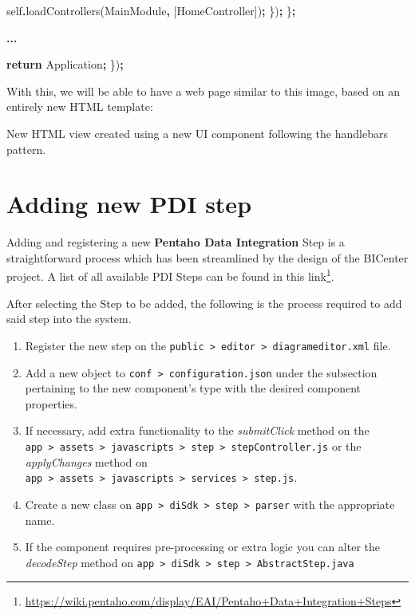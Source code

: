 \documentclass[
  11pt,
]{krantz}
\newenvironment{Shaded}{\begin{snugshade}}{\end{snugshade}}
\newcommand{\ControlFlowTok}[1]{\textcolor[rgb]{0.27,0.27,0.27}{\textbf{#1}}}
\newcommand{\FunctionTok}[1]{\textcolor[rgb]{0,0,0}{#1}}
\newcommand{\NormalTok}[1]{#1}
\newcommand{\OperatorTok}[1]{\textcolor[rgb]{0.43,0.43,0.43}{\textbf{#1}}}
\newcommand{\StringTok}[1]{\textcolor[rgb]{0.5,0.5,0.5}{#1}}
\providecommand{\tightlist}{%
  \setlength{\itemsep}{0pt}\setlength{\parskip}{0pt}}
\renewcommand{\href}[2]{#2\footnote{\url{#1}}}
\begin{document}
\begin{Shaded}
\begin{Highlighting}[]
\NormalTok{            self}\OperatorTok{.}\FunctionTok{loadControllers}\NormalTok{(}\StringTok{\textquotesingle{}MainModule\textquotesingle{}}\OperatorTok{,}\NormalTok{ [}\StringTok{\textquotesingle{}HomeController\textquotesingle{}}\NormalTok{])}\OperatorTok{;}
\NormalTok{        \})}\OperatorTok{;}
\NormalTok{    \}}\OperatorTok{;}

    \OperatorTok{...}

    \ControlFlowTok{return}\NormalTok{ Application}\OperatorTok{;}
\NormalTok{\})}\OperatorTok{;}
\end{Highlighting}
\end{Shaded}

With this, we will be able to have a web page similar to this image, based on an entirely new HTML template:

\label{fig:view}New HTML view created using a new UI component following the handlebars pattern.

\hypertarget{adding-new-pdi-step}{%
\section{Adding new PDI step}\label{adding-new-pdi-step}}

Adding and registering a new \textbf{Pentaho Data Integration} Step is a straightforward process which has been streamlined by the design of the BICenter project. A list of all available PDI Steps can be found in this \href{https://wiki.pentaho.com/display/EAI/Pentaho+Data+Integration+Steps}{link}.

After selecting the Step to be added, the following is the process required to add said step into the system.

\begin{enumerate}
\def\labelenumi{\arabic{enumi}.}
\tightlist
\item
  Register the new step on the \texttt{public\ \textgreater{}\ editor\ \textgreater{}\ diagrameditor.xml} file.
\item
  Add a new object to \texttt{conf\ \textgreater{}\ configuration.json} under the subsection pertaining to the new component's type with the desired component properties.
\item
  If necessary, add extra functionality to the \emph{submitClick} method on the \texttt{app\ \textgreater{}\ assets\ \textgreater{}\ javascripts\ \textgreater{}\ step\ \textgreater{}\ stepController.js} or the \emph{applyChanges} method on \texttt{app\ \textgreater{}\ assets\ \textgreater{}\ javascripts\ \textgreater{}\ services\ \textgreater{}\ step.js}.
\item
  Create a new class on \texttt{app\ \textgreater{}\ diSdk\ \textgreater{}\ step\ \textgreater{}\ parser} with the appropriate name.
\item
  If the component requires pre-processing or extra logic you can alter the \emph{decodeStep} method on \texttt{app\ \textgreater{}\ diSdk\ \textgreater{}\ step\ \textgreater{}\ AbstractStep.java}
\end{enumerate}
\end{document}
